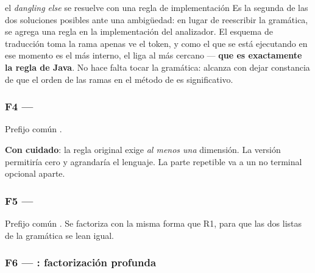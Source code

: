 \begin{decision}{el \emph{dangling else} se resuelve con una regla de implementación}
Es la segunda de las dos soluciones posibles ante una ambigüedad: en lugar de reescribir la
gramática, se agrega una regla en la implementación del analizador. El esquema de traducción toma
la rama  apenas ve el token, y como el  que se está ejecutando en ese momento es el
más interno, el  liga al  más cercano --- \textbf{que es exactamente la regla de
Java}. No hace falta tocar la gramática: alcanza con dejar constancia de que el orden de las ramas
en el método de  es significativo.
\end{decision}

\subsubsection{F4 --- }

 Prefijo común \tl{[}  \tl{]}.

 \textbf{Con cuidado}: la regla original exige \emph{al menos una}
dimensión. La versión  \deriva{} \tl{[}  \tl{]}
 \alt{} \eps{} permitiría cero y agrandaría el lenguaje. La parte
repetible va a un no terminal opcional aparte.

\begin{producciones}
\end{producciones}

\subsubsection{F5 --- }

Prefijo común . Se factoriza con la misma forma que R1, para que las dos listas de la
gramática se lean igual.
\begin{producciones}
\end{producciones}

\subsubsection{F6 --- : factorización profunda}

